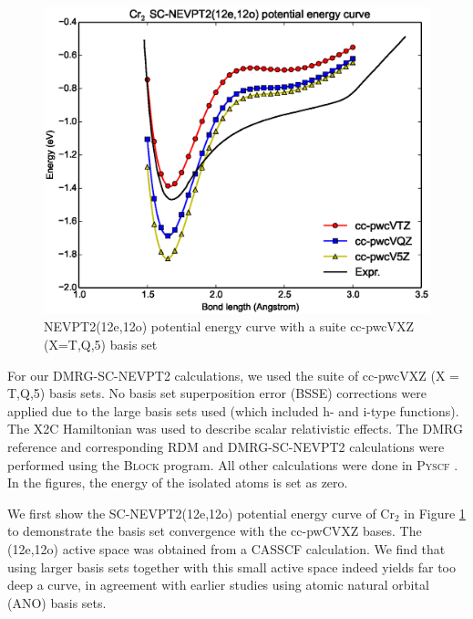 \begin{figure}
  \includegraphics[width=1.1\columnwidth]{Cr2-nevpt2.eps}
  \caption{NEVPT2(12e,12o) potential energy curve with a suite cc-pwcVXZ (X=T,Q,5) basis set}
  \label{fig:12o_nevpt2}
\end{figure}

For our DMRG-SC-NEVPT2 calculations, we used the suite of cc-pwcVXZ (X = T,Q,5) basis sets. No basis set superposition error (BSSE) corrections were applied 
due to the large basis sets used (which included h- and i-type functions). The X2C Hamiltonian was used to describe scalar relativistic effects. 
The DMRG reference and corresponding RDM and DMRG-SC-NEVPT2 calculations were performed using the \textsc{Block} program\cite{sharma_spin-adapted_2012}. 
All other calculations were done in \textsc{Pyscf} \cite{sun_pyscf}. In the figures, the energy of the isolated atoms is set as zero.

We first show the SC-NEVPT2(12e,12o) potential energy curve of Cr$_2$ in Figure \ref{fig:12o_nevpt2} 
to demonstrate the basis set convergence with the cc-pwCVXZ bases. The (12e,12o) active space was obtained from a CASSCF calculation. We find that
using larger basis sets together with this small active space indeed yields far too deep a curve, in agreement with earlier studies  using atomic natural orbital (ANO) basis sets.\cite{angeli_third-order_2006}

